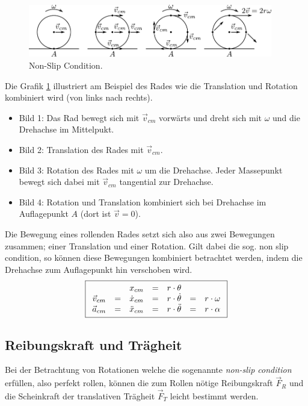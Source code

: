 \begin{figure}[h!]
	\centering
	\includegraphics[width=0.95\textwidth]{non-slip.pdf}
	\caption{Non-Slip Condition.}
	\label{fig:non-slip}
\end{figure}

\noindent
Die Grafik \ref{fig:non-slip} illustriert am Beispiel des Rades wie die 
Translation und Rotation kombiniert wird (von links nach rechts).
\begin{itemize}
	\item{Bild 1:} Das Rad bewegt sich mit $\vec{v}_{cm}$ vorwärts und
		dreht sich mit $\omega$ und die Drehachse im Mittelpukt.
	\item{Bild 2:} Translation des Rades mit $\vec{v}_{cm}$.
	\item{Bild 3:} Rotation des Rades mit $\omega$ um die Drehachse.
		Jeder Massepunkt bewegt sich dabei mit $\vec{v}_{cm}$
		tangential zur Drehachse.
	\item{Bild 4:} Rotation und Translation kombiniert sich bei
		Drehachse im Auflagepunkt $A$ (dort ist $\vec{v}=0$).
\end{itemize}
Die Bewegung eines rollenden Rades setzt sich also aus zwei Bewegungen
zusammen; einer Translation und einer Rotation. Gilt dabei die sog. 
non slip condition, so können diese Bewegungen kombiniert betrachtet 
werden, indem die Drehachse zum Auflagepunkt hin verschoben wird. 
\[ \boxed{\begin{array}{c c c c c c c}
		& & x_{cm} 
		&=& r \cdot \theta 
		& & \\
	\vec{v}_{cm} 
		&=& \dot{x}_{cm} 
		&=& r \cdot \dot{\theta }
		&=& r \cdot \omega \\
	\vec{a}_{cm} 
		&=& \ddot{x}_{cm}
		&=& r \cdot \ddot{\theta}
		&=& r \cdot \alpha
\end{array}}\]

\subsection{Reibungskraft und Trägheit}
Bei der Betrachtung von Rotationen welche die sogenannte 
\textit{non-slip condition} erfüllen, also perfekt rollen, können die 
zum Rollen nötige Reibungskraft $\vec{F}_R$ und die Scheinkraft der 
translativen Trägheit $\vec{F}_T$ leicht bestimmt werden.

